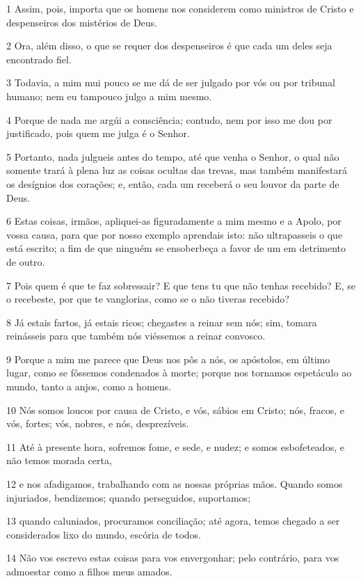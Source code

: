\par 1 Assim, pois, importa que os homens nos considerem como ministros de Cristo e despenseiros dos mistérios de Deus.
\par 2 Ora, além disso, o que se requer dos despenseiros é que cada um deles seja encontrado fiel.
\par 3 Todavia, a mim mui pouco se me dá de ser julgado por vós ou por tribunal humano; nem eu tampouco julgo a mim mesmo.
\par 4 Porque de nada me argúi a consciência; contudo, nem por isso me dou por justificado, pois quem me julga é o Senhor.
\par 5 Portanto, nada julgueis antes do tempo, até que venha o Senhor, o qual não somente trará à plena luz as coisas ocultas das trevas, mas também manifestará os desígnios dos corações; e, então, cada um receberá o seu louvor da parte de Deus.
\par 6 Estas coisas, irmãos, apliquei-as figuradamente a mim mesmo e a Apolo, por vossa causa, para que por nosso exemplo aprendais isto: não ultrapasseis o que está escrito; a fim de que ninguém se ensoberbeça a favor de um em detrimento de outro.
\par 7 Pois quem é que te faz sobressair? E que tens tu que não tenhas recebido? E, se o recebeste, por que te vanglorias, como se o não tiveras recebido?
\par 8 Já estais fartos, já estais ricos; chegastes a reinar sem nós; sim, tomara reinásseis para que também nós viéssemos a reinar convosco.
\par 9 Porque a mim me parece que Deus nos pôs a nós, os apóstolos, em último lugar, como se fôssemos condenados à morte; porque nos tornamos espetáculo ao mundo, tanto a anjos, como a homens.
\par 10 Nós somos loucos por causa de Cristo, e vós, sábios em Cristo; nós, fracos, e vós, fortes; vós, nobres, e nós, desprezíveis.
\par 11 Até à presente hora, sofremos fome, e sede, e nudez; e somos esbofeteados, e não temos morada certa,
\par 12 e nos afadigamos, trabalhando com as nossas próprias mãos. Quando somos injuriados, bendizemos; quando perseguidos, suportamos;
\par 13 quando caluniados, procuramos conciliação; até agora, temos chegado a ser considerados lixo do mundo, escória de todos.
\par 14 Não vos escrevo estas coisas para vos envergonhar; pelo contrário, para vos admoestar como a filhos meus amados.
